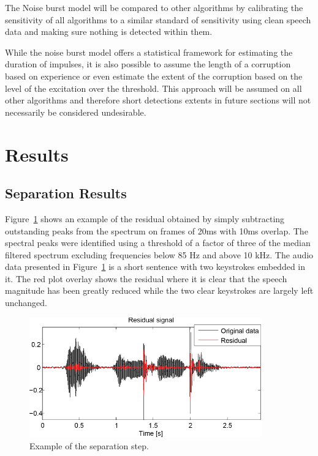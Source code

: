 The Noise burst model will be compared to other algorithms by calibrating the sensitivity of all algorithms to a similar standard of sensitivity using clean speech data and making sure nothing is detected within them.

While the noise burst model offers a statistical framework for estimating the duration of impulses, it is also possible to assume the length of a corruption based on experience or even estimate the extent of the corruption based on the level of the excitation over the threshold. This approach will be assumed on all other algorithms and therefore short detections extents in future sections will not necessarily be considered undesirable.

\section{Results}\label{sec:WPresults}
\subsection{Separation Results} %
Figure~\ref{fig:Separation_Residual_Example} shows an example of the residual obtained by simply subtracting outstanding peaks from the spectrum on frames of 20ms with 10ms overlap. The spectral peaks were identified using a threshold of a factor of three of the median filtered spectrum excluding frequencies below 85 Hz and above 10 kHz. The audio data presented in Figure~\ref{fig:Separation_Residual_Example} is a short sentence with two keystrokes embedded in it. The red plot overlay shows the residual where it is clear that the speech magnitude has been greatly reduced while the two clear keystrokes are largely left unchanged. 

\begin{figure}
\begin{minipage}[b]{1.0\linewidth}
  \centering
  \centerline{\includegraphics[width=10cm]{Separation_Residual_Example}}
\end{minipage}
\caption{Example of the separation step.}
\label{fig:Separation_Residual_Example}
\end{figure}

